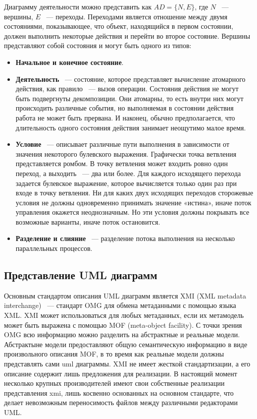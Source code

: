 Диаграмму деятельности можно представить как $ AD = \{ N, E \} $, где $ N $ ~--- вершины, $ E $ ~--- переходы. Переходами является отношение между двумя состояниями, показывающее, что объект, находящийся в первом состоянии, должен выполнить некоторые действия и перейти во второе состояние. Вершины представляют собой состояния и могут быть одного из типов:
\begin{itemize}
\item \textbf{Начальное и конечное состояние}.
\item \textbf{Деятельность} ~--- состояние, которое представляет вычисление атомарного действия, как правило ~--- вызов операции. Состояния действия не могут быть подвергнуты декомпозиции. Они атомарны, то есть внутри них могут происходить различные события, но выполняемая в состоянии действия работа не может быть прервана. И наконец, обычно предполагается, что длительность одного состояния действия занимает неощутимо малое время.
\item \textbf{Условие} ~--- описывает различные пути выполнения в зависимости от значения некоторого булевского выражения. Графически точка ветвления представляется ромбом. В точку ветвления может входить ровно один переход, а выходить ~--- два или более. Для каждого исходящего перехода задается булевское выражение, которое вычисляется только один раз при входе в точку ветвления. Ни для каких двух исходящих переходов сторожевые условия не должны одновременно принимать значение «истина», иначе поток управления окажется неоднозначным. Но эти условия должны покрывать все возможные варианты, иначе поток остановится.
\item \textbf{Разделение и слияние} ~--- разделение потока выполнения на несколько параллельных процессов.
\end{itemize}

\subsection{Представление UML диаграмм}

Основным стандартом описания UML диаграмм является XMI (XML metadata interchange) ~--- стандарт OMG для обмена метаданными с помощью языка XML. XMI может использоваться для любых метаданных, если их метамодель может быть выражена с помощью MOF (meta-object facility). С точки зрения OMG всю информацию можно разделить на абстрактные и реальные модели. Абстрактыне модели предоставляют общую семантическую информацию в виде произвольного описания MOF, в то время как реальные модели должны представлять сами uml диаграммы. XMI не имеет жесткой стандартизации, а его описание содержит лишь предложения для реализации. В настоящий момент несколько крупных производителей имеют свои собственные реализации представления xmi, лишь косвенно основанных на основном стандарте, что делает невозможным переносимость файлов между различными редакторами UML.

